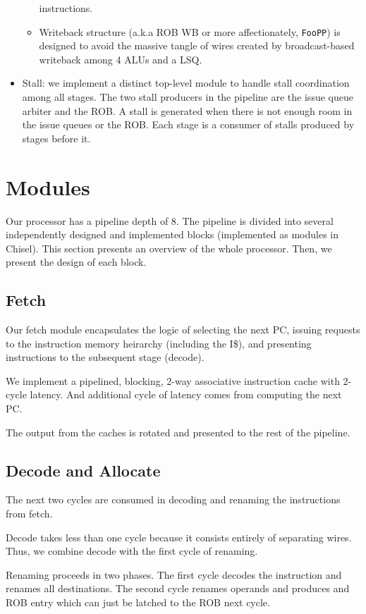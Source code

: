 \documentclass{article}
\begin{document}
\begin{itemize}
\begin{itemize}
                instructions.
            \item Writeback structure (a.k.a ROB WB or more affectionately,
                \texttt{FooPP}) is designed to avoid the massive tangle of wires
                created by broadcast-based writeback among 4 ALUs and a LSQ.
        \end{itemize}
    \item Stall: we implement a distinct top-level module to handle stall
        coordination among all stages. The two stall producers in the pipeline
        are the issue queue arbiter and the ROB. A stall is generated when there
        is not enough room in the issue queues or the ROB. Each stage is a
        consumer of stalls produced by stages before it.
\end{itemize}

\section{Modules}

Our processor has a pipeline depth of 8. The pipeline is divided into several
independently designed and implemented blocks (implemented as modules in
Chisel). This section presents an overview of the whole processor. Then, we
present the design of each block.

\subsection{Fetch}

Our fetch module encapsulates the logic of selecting the next PC, issuing
requests to the instruction memory heirarchy (including the I\$), and presenting
instructions to the subsequent stage (decode).

We implement a pipelined, blocking, 2-way associative instruction cache with
2-cycle latency. And additional cycle of latency comes from computing the next
PC.

The output from the caches is rotated and presented to the rest of the pipeline.

\subsection{Decode and Allocate}

The next two cycles are consumed in decoding and renaming the instructions from
fetch.

Decode takes less than one cycle because it consists entirely of separating
wires. Thus, we combine decode with the first cycle of renaming.

Renaming proceeds in two phases. The first cycle decodes the instruction and
renames all destinations. The second cycle renames operands and produces and ROB
entry which can just be latched to the ROB next cycle.
\end{document}
